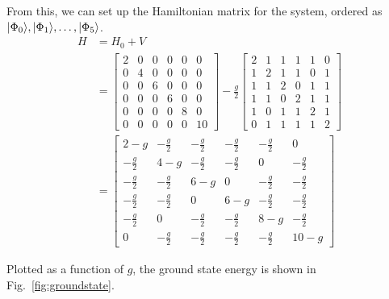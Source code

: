 From this, we can set up the Hamiltonian matrix for the system, ordered as $\lvert\Phi_0\rangle, \lvert\Phi_1\rangle, \ldots, \lvert\Phi_5\rangle$.
\begin{align*}
    H &= H_0 + V \\
    &=
    \begin{bmatrix}
        2 & 0 & 0 & 0 & 0 & 0 \\
        0 & 4 & 0 & 0 & 0 & 0 \\
        0 & 0 & 6 & 0 & 0 & 0 \\
        0 & 0 & 0 & 6 & 0 & 0 \\
        0 & 0 & 0 & 0 & 8 & 0 \\
        0 & 0 & 0 & 0 & 0 & 10
    \end{bmatrix}
    - \frac{g}{2}
    \begin{bmatrix}
        2 & 1 & 1 & 1 & 1 & 0 \\
        1 & 2 & 1 & 1 & 0 & 1 \\
        1 & 1 & 2 & 0 & 1 & 1 \\
        1 & 1 & 0 & 2 & 1 & 1 \\
        1 & 0 & 1 & 1 & 2 & 1 \\
        0 & 1 & 1 & 1 & 1 & 2
    \end{bmatrix} \\
    &=
    \begin{bmatrix}
        2 - g & - \frac{g}{2} & - \frac{g}{2} & - \frac{g}{2} & - \frac{g}{2} & 0 \\
        - \frac{g}{2} & 4 - g & - \frac{g}{2} & - \frac{g}{2} & 0 & - \frac{g}{2} \\
        - \frac{g}{2} & - \frac{g}{2} & 6 - g & 0 & - \frac{g}{2} & - \frac{g}{2} \\
        - \frac{g}{2} & - \frac{g}{2} & 0 & 6 - g & - \frac{g}{2} & - \frac{g}{2} \\
        - \frac{g}{2} & 0 & - \frac{g}{2} & - \frac{g}{2} & 8 - g & - \frac{g}{2} \\
        0 & - \frac{g}{2} & - \frac{g}{2} & - \frac{g}{2} & - \frac{g}{2} & 10 - g
    \end{bmatrix}
\end{align*}

Plotted as a function of $g$, the ground state energy is shown in Fig.~\ref{fig:groundstate}.

